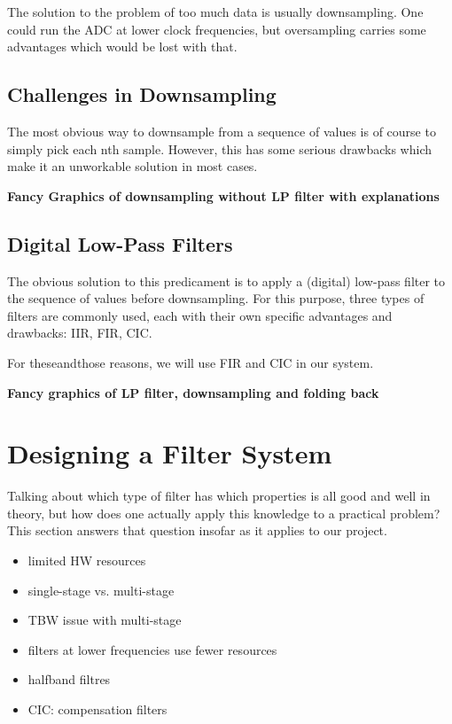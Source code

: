 The solution to the problem of too much data is usually downsampling. One could run
the ADC at lower clock frequencies, but oversampling carries some advantages which would
be lost with that.

\subsection{Challenges in Downsampling}
\label{subsec:downsampling}

The most obvious way to downsample from a sequence of values is of course to simply pick
each nth sample. However, this has some serious drawbacks which make it an unworkable solution
in most cases.

\textbf{Fancy Graphics of downsampling without LP filter with explanations}


\subsection{Digital Low-Pass Filters}
\label{subsec:digital-lp-filters}

The obvious solution to this predicament is to apply a (digital) low-pass filter to the
sequence of values before downsampling. For this purpose, three types of filters are commonly
used, each with their own specific advantages and drawbacks: IIR, FIR, CIC.

For theseandthose reasons, we will use FIR and CIC in our system.

\textbf{Fancy graphics of LP filter, downsampling and folding back}

\section{Designing a Filter System}
\label{sec:designing-a-filter-system}

Talking about which type of filter has which properties is all good and well in theory, but
how does one actually apply this knowledge to a practical problem? This section answers that
question insofar as it applies to our project.

\begin{itemize}\tightlist
    \item
        limited HW resources
    \item
        single-stage vs. multi-stage
    \item
        TBW issue with multi-stage
    \item
        filters at lower frequencies use fewer resources
    \item
        halfband filtres
    \item
        CIC: compensation filters
\end{itemize}

